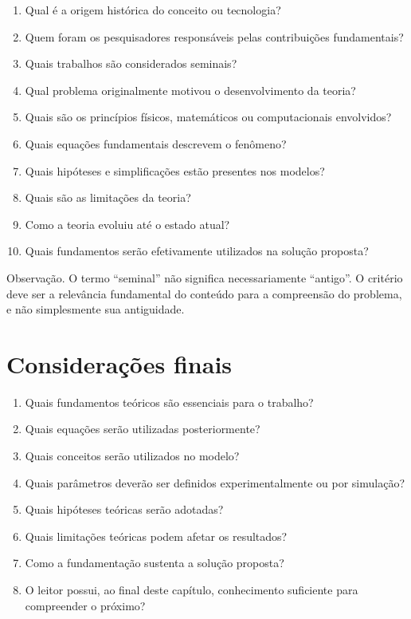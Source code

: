 \begin{enumerate}
	\item Qual é a origem histórica do conceito ou tecnologia?
	\item Quem foram os pesquisadores responsáveis pelas contribuições fundamentais?
	\item Quais trabalhos são considerados seminais?
	\item Qual problema originalmente motivou o desenvolvimento da teoria?
	\item Quais são os princípios físicos, matemáticos ou computacionais envolvidos?
	\item Quais equações fundamentais descrevem o fenômeno?
	\item Quais hipóteses e simplificações estão presentes nos modelos?
	\item Quais são as limitações da teoria?
	\item Como a teoria evoluiu até o estado atual?
	\item Quais fundamentos serão efetivamente utilizados na solução proposta?
\end{enumerate}

{Observação.}
O termo ``seminal'' não significa necessariamente ``antigo''. O critério deve
ser a relevância fundamental do conteúdo para a compreensão do problema, e
não simplesmente sua antiguidade.

\section{Considerações finais}

\begin{enumerate}
	\item Quais fundamentos teóricos são essenciais para o trabalho?
	\item Quais equações serão utilizadas posteriormente?
	\item Quais conceitos serão utilizados no modelo?
	\item Quais parâmetros deverão ser definidos experimentalmente ou por simulação?
	\item Quais hipóteses teóricas serão adotadas?
	\item Quais limitações teóricas podem afetar os resultados?
	\item Como a fundamentação sustenta a solução proposta?
	\item O leitor possui, ao final deste capítulo, conhecimento suficiente para compreender o próximo?
\end{enumerate}